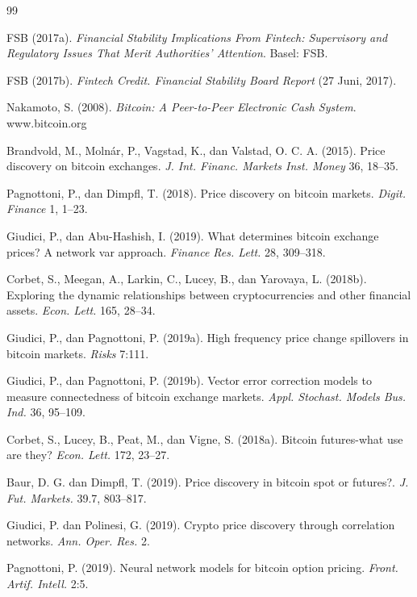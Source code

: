 \documentclass[12pt,a4paper]{article}
\begin{document}
\begin{thebibliography}{99}

 FSB (2017a). \textit{Financial Stability Implications From Fintech: Supervisory and Regulatory Issues That Merit Authorities' Attention}. Basel: FSB.

 FSB (2017b). \textit{Fintech Credit. Financial Stability Board Report} (27 Juni, 2017).

 Nakamoto, S. (2008). \textit{Bitcoin: A Peer-to-Peer Electronic Cash System}. www.bitcoin.org

 Brandvold, M., Molnár, P., Vagstad, K., dan Valstad, O. C. A. (2015). Price discovery on bitcoin exchanges. \textit{J. Int. Financ. Markets Inst. Money} 36, 18–35.

 Pagnottoni, P., dan Dimpfl, T. (2018). Price discovery on bitcoin markets. \textit{Digit. Finance} 1, 1–23.

 Giudici, P., dan Abu-Hashish, I. (2019). What determines bitcoin exchange prices? A network var approach. \textit{Finance Res. Lett.} 28, 309–318.

 Corbet, S., Meegan, A., Larkin, C., Lucey, B., dan Yarovaya, L. (2018b). Exploring the dynamic relationships between cryptocurrencies and other financial assets. \textit{Econ. Lett.} 165, 28–34.

 Giudici, P., dan Pagnottoni, P. (2019a). High frequency price change spillovers in bitcoin markets. \textit{Risks} 7:111.

 Giudici, P., dan Pagnottoni, P. (2019b). Vector error correction models to measure connectedness of bitcoin exchange markets. \textit{Appl. Stochast. Models Bus. Ind.} 36, 95–109.

 Corbet, S., Lucey, B., Peat, M., dan Vigne, S. (2018a). Bitcoin futures-what use are they? \textit{Econ. Lett.} 172, 23–27.

 Baur, D. G. dan Dimpfl, T. (2019). Price discovery in bitcoin spot or futures?. \textit{J. Fut. Markets.} 39.7, 803–817.

 Giudici, P. dan Polinesi, G. (2019). Crypto price discovery through correlation networks. \textit{Ann. Oper. Res.} 2.

 Pagnottoni, P. (2019). Neural network models for bitcoin option pricing. \textit{Front. Artif. Intell.} 2:5.


\end{thebibliography}
\end{document}
